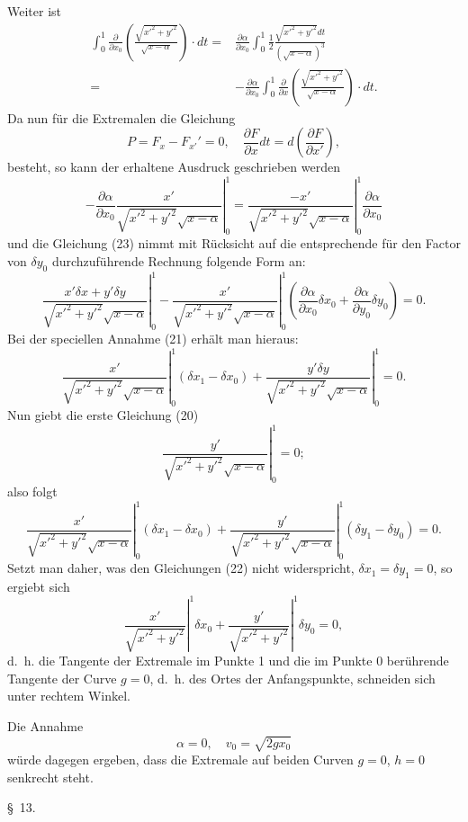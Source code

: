 \documentclass[11pt,a4paper,leqno]{article}
\begin{document}
Weiter ist
\[
\begin{split}
\int_0^1\frac{\partial}{\partial x_0}\left(\frac{\sqrt{x'^2+y'^2}}{\sqrt{x-\alpha}}\right)\cdot dt
={}&\frac{\partial\alpha}{\partial x_0}\int_0^1\frac{1}{2}\frac{\sqrt{x'^2+y'^2}dt}{(\sqrt{x-\alpha})^3}\\
={}&-\frac{\partial\alpha}{\partial x_0}\int_0^1\frac{\partial}{\partial x}\left(\frac{\sqrt{x'^2+y'^2}}{\sqrt{x-\alpha}}\right)\cdot dt.
\end{split}
\]
Da nun für die Extremalen die Gleichung
\[
P=F_x-F_{x'}'=0,\quad \frac{\partial F}{\partial x}dt=d\left(\frac{\partial F}{\partial x'}\right),
\]
besteht, so kann der erhaltene Ausdruck geschrieben werden
\[
-\frac{\partial\alpha}{\partial x_0}\left.\frac{x'}{\sqrt{x'^2+y'^2}\sqrt{x-\alpha}}\right|_0^1
=\left.\frac{-x'}{\sqrt{x'^2+y'^2}\sqrt{x-\alpha}}\right|_0^1\frac{\partial\alpha}{\partial x_0}
\]
und die Gleichung (23) nimmt mit Rücksicht auf die entsprechende für den Factor von $\delta y_0$ durchzuführende Rechnung folgende Form an:
\[
\left.\frac{x'\delta x+y'\delta y}{\sqrt{x'^2+y'^2}\sqrt{x-\alpha}}\right|_0^1
-\left.\frac{x'}{\sqrt{x'^2+y'^2}\sqrt{x-\alpha}}\right|_0^1\left(\frac{\partial\alpha}{\partial x_0}\delta x_0+\frac{\partial\alpha}{\partial y_0}\delta y_0\right)=0.
\]
Bei der speciellen Annahme (21) erhält man hieraus:
\[
\left.\frac{x'}{\sqrt{x'^2+y'^2}\sqrt{x-\alpha}}\right|_0^1(\delta x_1-\delta x_0)
+\left.\frac{y'\delta y}{\sqrt{x'^2+y'^2}\sqrt{x-\alpha}}\right|_0^1=0.
\]
Nun giebt die erste Gleichung (20)
\[
\left.\frac{y'}{\sqrt{x'^2+y'^2}\sqrt{x-\alpha}}\right|_0^1=0;
\]
also folgt
\[
\left.\frac{x'}{\sqrt{x'^2+y'^2}\sqrt{x-\alpha}}\right|_0^1(\delta x_1-\delta x_0)
+\left.\frac{y'}{\sqrt{x'^2+y'^2}\sqrt{x-\alpha}}\right|_0^1(\delta y_1-\delta y_0)=0.
\]
Setzt man daher, was den Gleichungen (22) nicht widerspricht, $\delta x_1=\delta y_1=0$, so ergiebt sich
\[
\left.\frac{x'}{\sqrt{x'^2+y'^2}}\right|^1\delta x_0+
\left.\frac{y'}{\sqrt{x'^2+y'^2}}\right|^1\delta y_0=0,
\]
d.~h. die Tangente der Extremale im Punkte 1 und die im Punkte 0 berührende Tangente der Curve $g=0$, d.~h. des Ortes der Anfangspunkte, schneiden sich unter rechtem Winkel.

Die Annahme
\[
\alpha=0,\quad v_0=\sqrt{2gx_0}
\]
würde dagegen ergeben, dass die Extremale auf beiden Curven $g=0$, $h=0$ senkrecht steht.

\begin{center}{\large \S~13.}\end{center}
\end{document}
